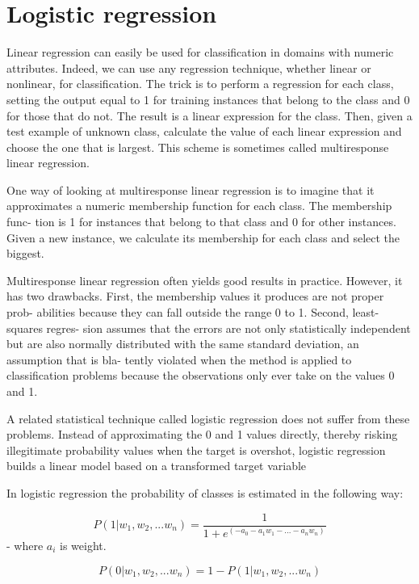 \documentclass[12pt]{report}
\begin{document}
\newpage

\section{Logistic regression}

Linear regression can easily be used for classification in domains with numeric attributes. Indeed, we can use any regression technique, whether linear or nonlinear, for classification. The trick is to perform a regression for each class, setting the output equal to 1 for training instances that belong to the class and 0 for those that do not. The result is a linear expression for the class. Then, given a test example of unknown class, calculate the value of each linear expression and choose the one that is largest. This scheme is sometimes called multiresponse linear regression.

One way of looking at multiresponse linear regression is to imagine that it approximates a numeric membership function for each class. The membership func- tion is 1 for instances that belong to that class and 0 for other instances. Given a new instance, we calculate its membership for each class and select the biggest.

Multiresponse linear regression often yields good results in practice. However, it has two drawbacks. First, the membership values it produces are not proper prob- abilities because they can fall outside the range 0 to 1. Second, least-squares regres- sion assumes that the errors are not only statistically independent but are also normally distributed with the same standard deviation, an assumption that is bla- tently violated when the method is applied to classification problems because the observations only ever take on the values 0 and 1.

A related statistical technique called logistic regression does not suffer from these problems. Instead of approximating the 0 and 1 values directly, thereby risking illegitimate probability values when the target is overshot, logistic regression builds a linear model based on a transformed target variable %

In logistic regression the probability of classes is estimated in the following way:

$$P(1 | w_1, w_2, ... w_n) = \dfrac{1}{1 + e^(-a_0 - a_1 w_1 - ... - a_n w_n)}$$
- where $a_i$ is weight.

$$P(0 | w_1, w_2, ... w_n) = 1 - P(1 | w_1, w_2, ... w_n)$$
\end{document}
